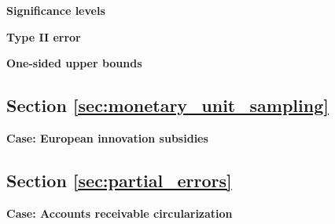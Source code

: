 \begin{exercise}
\label{ex:probability_of_sample_results}

\textbf{Significance levels}



\end{exercise}

\begin{exercise}
\label{ex:type_two}

\textbf{Type II error}



\end{exercise}

\begin{exercise}
\label{ex:upper_bounds}

\textbf{One-sided upper bounds}



\end{exercise}

\subsection{Section \ref{sec:monetary_unit_sampling}}

\begin{exercise}
\label{ex:subsidies}

\textbf{Case: European innovation subsidies}





\end{exercise}

\subsection{Section \ref{sec:partial_errors}}

\begin{exercise}
\label{ex:accounts_receivable}

\textbf{Case: Accounts receivable circularization}





\end{exercise}

